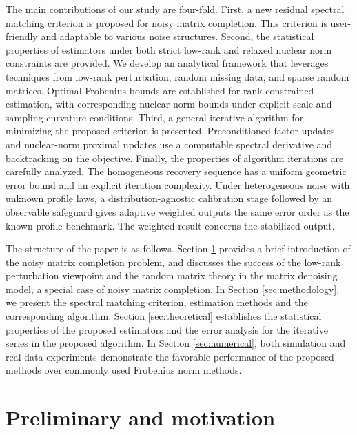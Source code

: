 \documentclass[numsec,webpdf,modern,large,namedate]{oup-authoring-template}
\theoremstyle{plain}
\theoremstyle{remark}
\newif\ifmarkchanges
\newenvironment{revision}{\begingroup\ifmarkchanges\color{red}\fi}{\endgroup}
\begin{document}
\begin{revision}
The main contributions of our study are four-fold. First, a new residual spectral matching criterion is proposed for noisy matrix completion. This criterion is user-friendly and adaptable to various noise structures. Second, the statistical properties of estimators under both strict low-rank and relaxed nuclear norm constraints are provided. We develop an analytical framework that leverages techniques from low-rank perturbation, random missing data, and sparse random matrices. Optimal Frobenius bounds are established for rank-constrained estimation, with corresponding nuclear-norm bounds under explicit scale and sampling-curvature conditions. Third, a general iterative algorithm for minimizing the proposed criterion is presented. Preconditioned factor updates and nuclear-norm proximal updates use a computable spectral derivative and backtracking on the objective. Finally, the properties of algorithm iterations are carefully analyzed.
The homogeneous recovery sequence has a uniform geometric error bound
and an explicit iteration complexity. Under heterogeneous noise with
unknown profile laws, a distribution-agnostic calibration stage followed
by an observable safeguard gives adaptive weighted outputs the same
error order as the known-profile benchmark. The weighted result concerns the stabilized output.

\end{revision}

The structure of the paper is as follows. Section \ref{sec:preliminary} provides a brief introduction of the noisy matrix completion problem, and discusses the success of the low-rank perturbation viewpoint and the random matrix theory in the matrix denoising model, a special case of noisy matrix completion. In Section \ref{sec:methodology}, we present the spectral matching criterion, estimation methods and the corresponding algorithm. Section \ref{sec:theoretical} establishes the statistical properties of the proposed estimators and the error analysis for the iterative series in the proposed algorithm. In Section \ref{sec:numerical}, both simulation and real data experiments demonstrate the favorable performance of the proposed methods over commonly used Frobenius norm methods.

\section{Preliminary and motivation}
\label{sec:preliminary}
\end{document}
